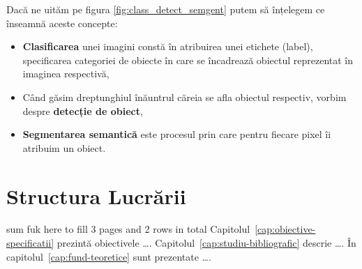 Dacă ne uităm pe figura \ref{fig:class_detect_semgent} putem să înțelegem ce înseamnă aceste concepte:
\begin{itemize}
	\item \textbf{Clasificarea} unei imagini constă în atribuirea unei etichete (label), specificarea categoriei de obiecte în care se încadrează obiectul reprezentat în imaginea respectivă,
	\item Când găsim dreptunghiul înăuntrul căreia se afla obiectul respectiv, vorbim despre \textbf{detecție de obiect},
	\item \textbf{Segmentarea semantică} este procesul prin care pentru fiecare pixel îi atribuim un obiect.
\end{itemize}
\section {Structura Lucrării}
sum fuk here to fill 3 pages and 2 rows in total
Capitolul~\ref{cap:obiective-specificatii} prezintă obiectivele \dots. Capitolul~\ref{cap:studiu-bibliografic} descrie \dots. În capitolul~\ref{cap:fund-teoretice} sunt prezentate \dots.

